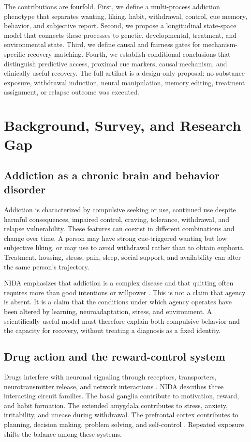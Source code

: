 \documentclass[conference]{IEEEtran}
\begin{document}
The contributions are fourfold. First, we define a multi-process addiction phenotype that separates wanting, liking, habit, withdrawal, control, cue memory, behavior, and subjective report. Second, we propose a longitudinal state-space model that connects these processes to genetic, developmental, treatment, and environmental state. Third, we define causal and fairness gates for mechanism-specific recovery matching. Fourth, we establish conditional conclusions that distinguish predictive access, proximal cue markers, causal mechanism, and clinically useful recovery. The full artifact is a design-only proposal: no substance exposure, withdrawal induction, neural manipulation, memory editing, treatment assignment, or relapse outcome was executed.

\section{Background, Survey, and Research Gap}
\subsection{Addiction as a chronic brain and behavior disorder}
Addiction is characterized by compulsive seeking or use, continued use despite harmful consequences, impaired control, craving, tolerance, withdrawal, and relapse vulnerability. These features can coexist in different combinations and change over time. A person may have strong cue-triggered wanting but low subjective liking, or may use to avoid withdrawal rather than to obtain euphoria. Treatment, housing, stress, pain, sleep, social support, and availability can alter the same person's trajectory.

NIDA emphasizes that addiction is a complex disease and that quitting often requires more than good intentions or willpower \cite{NIDAAddiction}. This is not a claim that agency is absent. It is a claim that the conditions under which agency operates have been altered by learning, neuroadaptation, stress, and environment. A scientifically useful model must therefore explain both compulsive behavior and the capacity for recovery, without treating a diagnosis as a fixed identity.

\subsection{Drug action and the reward-control system}
Drugs interfere with neuronal signaling through receptors, transporters, neurotransmitter release, and network interactions \cite{NIDABrain}. NIDA describes three interacting circuit families. The basal ganglia contribute to motivation, reward, and habit formation. The extended amygdala contributes to stress, anxiety, irritability, and unease during withdrawal. The prefrontal cortex contributes to planning, decision making, problem solving, and self-control \cite{NIDABrain,KoobVolkow2016}. Repeated exposure shifts the balance among these systems.
\end{document}
